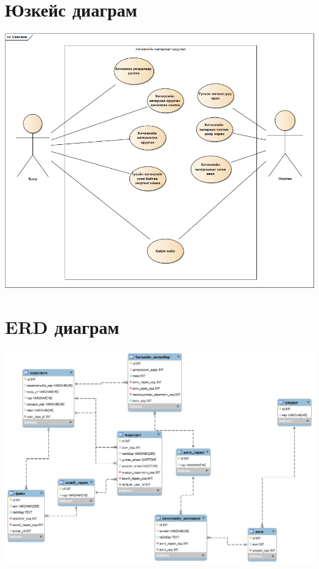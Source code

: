 \documentclass[12pt]{article}
\begin{document}
	\section{Юзкейс диаграм}	
		\includegraphics[scale=0.50]{usecase}
		
	\section{ERD диаграм}
		\includegraphics[scale=0.5]{ERD}
		
\end{document}
